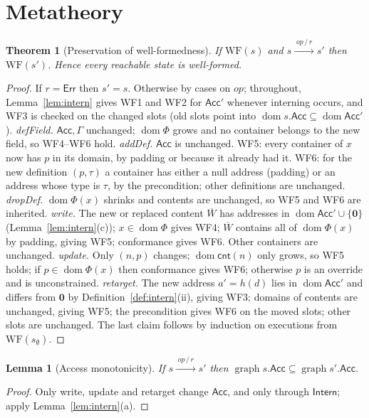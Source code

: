 \documentclass[11pt,a4paper]{article}
\theoremstyle{definition}
\theoremstyle{plain}
\newtheorem{lemma}[definition]{Lemma}
\newtheorem{theorem}[definition]{Theorem}
\theoremstyle{remark}
\newcommand{\nul}{\mathbf{0}}
\newcommand{\Err}{\mathsf{Err}}
\newcommand{\dom}{\operatorname{dom}}
\newcommand{\graph}{\operatorname{graph}}
\newcommand{\cnt}{\mathsf{cnt}}
\newcommand{\Acc}{\mathsf{Acc}}
\newcommand{\Intern}{\mathsf{Intern}}
\newcommand{\tr}[2]{\xrightarrow{\;#1\,/\,#2\;}}
\begin{document}
\section{Metatheory}
\label{sec:meta}

\begin{theorem}[Preservation of well-formedness]\label{thm:wf}
If $\mathrm{WF}(s)$ and $s\tr{\mathit{op}}{r}s'$ then $\mathrm{WF}(s')$. Hence every reachable state is well-formed.
\end{theorem}
\begin{proof}
If $r=\Err$ then $s'=s$. Otherwise by cases on $\mathit{op}$; throughout, Lemma~\ref{lem:intern} gives WF1 and WF2 for $\Acc'$ whenever interning occurs, and
WF3 is checked on the changed slots (old slots point into $\dom s.\Acc\subseteq\dom\Acc'$).
\emph{defField.} $\Acc,\Gamma$ unchanged; $\dom\Phi$ grows and no container belongs to the new field, so WF4--WF6 hold.
\emph{addDef.} $\Acc$ is unchanged. WF5: every container of $x$ now has $p$ in its domain, by padding or because it already had it. WF6: for the new definition $(p,\tau)$ a container has either a null address (padding) or an address whose type is $\tau$, by the precondition; other definitions are unchanged.
\emph{dropDef.} $\dom\Phi(x)$ shrinks and contents are unchanged, so WF5 and WF6 are inherited.
\emph{write.} The new or replaced content $\overline W$ has addresses in $\dom\Acc'\cup\{\nul\}$ (Lemma~\ref{lem:intern}(c)); $x\in\dom\Phi$ gives WF4; $\overline W$ contains all of $\dom\Phi(x)$ by padding, giving WF5; conformance gives WF6. Other containers are unchanged.
\emph{update.} Only $(n,p)$ changes; $\dom\cnt(n)$ only grows, so WF5 holds; if $p\in\dom\Phi(x)$ then conformance gives WF6; otherwise $p$ is an override and is unconstrained.
\emph{retarget.} The new address $a'=h(d)$ lies in $\dom\Acc'$ and differs from $\nul$ by Definition~\ref{def:intern}(ii), giving WF3; domains of contents are unchanged, giving WF5; the precondition gives WF6 on the moved slots; other slots are unchanged.
The last claim follows by induction on executions from $\mathrm{WF}(s_\emptyset)$.
\end{proof}

\begin{lemma}[Access monotonicity]\label{lem:accmono}
If $s\tr{\mathit{op}}{r}s'$ then $\graph s.\Acc\subseteq\graph s'.\Acc$.
\end{lemma}
\begin{proof}
Only \textsf{write}, \textsf{update} and \textsf{retarget} change $\Acc$, and only through $\Intern$; apply Lemma~\ref{lem:intern}(a).
\end{proof}
\end{document}
